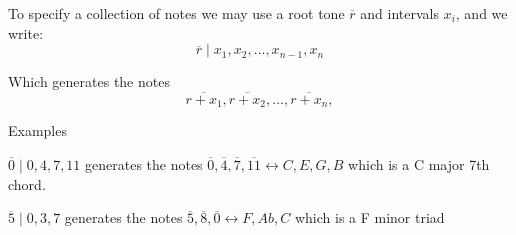 \documentclass[preview]{standalone}
\begin{document}
\begin{center}
To specify a collection of notes we may use a root tone $\overline{r}$ and intervals $x_i$, and we write:
  \[
	  \overline{r} \mid x_{1} , x_{2} , \dotsc  , x_{n - 1} , x_{n}
  \]

  Which generates the notes
	  \[
	  \overline{r  +  x_{1}}, \overline{r  +  x_{2}}, \ldots, \overline{r  +  x_{n}}, 
	  \]
  
  Examples

	$ \overline{0} \mid 0, 4, 7, 11$ generates the notes $ \overline{0}, \overline{4}, \overline{7}, \overline{11} \leftrightarrow C, E, G, B$ which is a C major 7th chord.

	$ \overline{5} \mid 0, 3, 7$ generates the notes $ \overline{5}, \overline{8}, \overline{0} \leftrightarrow F, Ab, C$ which is a F minor triad
\end{center}
\end{document}
